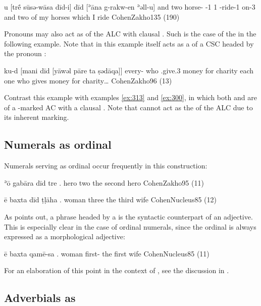 {u\cb{} [trḗ sūsə-wāsa dīd-i] dīd [ʾāna g-rakw-en ʾəll-u]}
{and\cb{} two horse-\pl{} \lnkd{}-1\sg{} \lnkd{} 1\sg{} \ind-ride-1\sg{} on-3\pl}
{and two of my horses which I ride}
{CohenZakho}{135 (190)}



Pronouns may also act as  \prims of the ALC with clausal \secns. Such is the case of the   in the following example. Note that in this example  itself acts as a \secn of a CSC headed by the pronoun :

{ku-d [mani dīd [yāwəl pāre ta ṣədāqa]]}
{every-\cst{} who \lnkd{} \sbjv.give.3\masc{} money for charity}
{each one who gives money for charity…}
{CohenZakho}{96 (13)}

Contrast this example with examples \ref{ex:313} and \vref{ex:300}, in which both  and  are \prims of a \cst*-marked AC with a clausal \secn. Note that  cannot act as the \prim of the ALC  due to its inherent \cst* marking.


\subsection{Numerals as ordinal \secns}

Numerals serving as ordinal \secns occur frequently in this construction:

{ʾō gabāra dīd tre}
{\dem.\masc{} hero \lnkd{} two}
{the second hero}
{CohenZakho}{95 (11)}

{ē baxta dīd ṭḷāha}
{\dem.\fem{} woman \lnkd{} three}
{the third wife}
{CohenNucleus}{85 (12)}

As \citet[85]{CohenNucleus} points out, a phrase headed by a  is the syntactic counterpart of an adjective. This is especially clear in the case of ordinal numerals, since the ordinal  is always expressed as a morphological adjective:

{ē baxta qamē-sa}
{\dem.\fem{} woman first-\fem}
{the first wife}
{CohenNucleus}{85 (11)}

For an elaboration of this point in the context of \Syr, see the discussion in .

\subsection{Adverbials as \secns}

